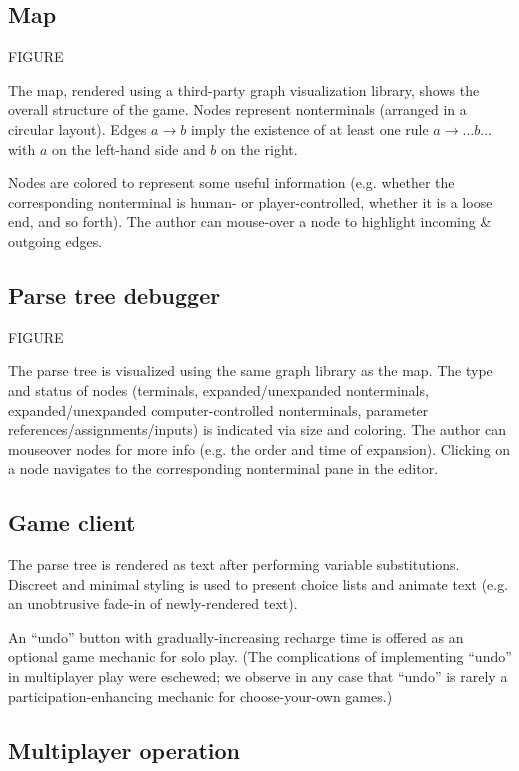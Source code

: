 \documentclass{acm_proc_article-sp}
\begin{document}
\subsection{Map}

FIGURE

The map, rendered using a third-party graph visualization library,
shows the overall structure of the game.
Nodes represent nonterminals (arranged in a circular layout).
Edges $a \to b$ imply the existence of at least one rule $a \to \ldots b \ldots$
with $a$ on the left-hand side and $b$ on the right.

Nodes are colored to represent some useful information
(e.g. whether the corresponding nonterminal is human- or player-controlled,
whether it is a loose end, and so forth).
The author can mouse-over a node to highlight incoming \& outgoing edges.

\subsection{Parse tree debugger}

FIGURE

The parse tree is visualized using the same graph library as the map.
The type and status of nodes (terminals, expanded/unexpanded nonterminals, expanded/unexpanded computer-controlled nonterminals, parameter references/assignments/inputs) is indicated via size and coloring.
The author can mouseover nodes for more info (e.g. the order and time of expansion).
Clicking on a node navigates to the corresponding nonterminal pane in the editor.

\subsection{Game client}

The parse tree is rendered as text after performing variable substitutions.
Discreet and minimal styling is used to present choice lists and animate text
(e.g. an unobtrusive fade-in of newly-rendered text).

An ``undo'' button with gradually-increasing recharge time is offered as an optional game mechanic for solo play.
(The complications of implementing ``undo'' in multiplayer play were eschewed;
 we observe in any case that ``undo'' is rarely a participation-enhancing mechanic for choose-your-own games.)

\subsection{Multiplayer operation}
\end{document}
